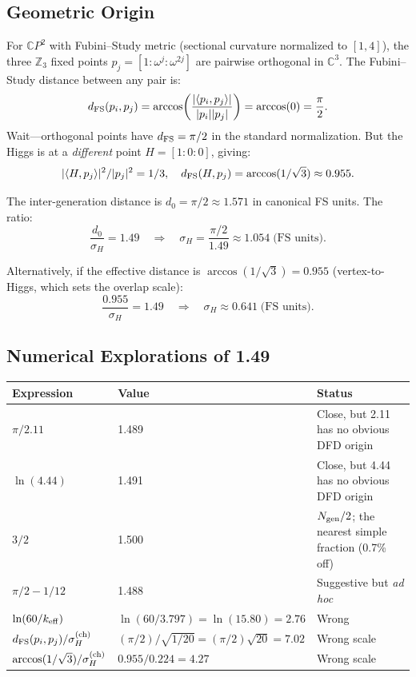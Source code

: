 \documentclass[11pt]{article}
\newcommand{\CP}{\mathbb{C}P}
\theoremstyle{remark}
\begin{document}
\subsection{Geometric Origin}

For $\CP^2$ with Fubini--Study metric (sectional curvature
normalized to $[1,4]$), the three $\mathbb{Z}_3$ fixed points
$p_j = [1:\omega^j:\omega^{2j}]$ are pairwise orthogonal in $\mathbb{C}^3$.
The Fubini--Study distance between any pair is:
\begin{equation}
d_{\rm FS}(p_i, p_j) = \arccos\!\left(\frac{|\langle p_i, p_j\rangle|}{|p_i||p_j|}\right)
= \arccos(0) = \frac{\pi}{2}.
\end{equation}
Wait---orthogonal points have $d_{\rm FS} = \pi/2$ in the standard
normalization. But the Higgs is at a \emph{different} point
$H = [1:0:0]$, giving:
\begin{equation}
|\langle H, p_j\rangle|^2 / |p_j|^2 = 1/3, \quad
d_{\rm FS}(H, p_j) = \arccos(1/\sqrt{3}) \approx 0.955.
\end{equation}

The inter-generation distance is $d_0 = \pi/2 \approx 1.571$ in
canonical FS units. The ratio:
\begin{equation}
\frac{d_0}{\sigma_H} = 1.49 \quad \Longrightarrow \quad
\sigma_H = \frac{\pi/2}{1.49} \approx 1.054 \;\text{(FS units)}.
\end{equation}

Alternatively, if the effective distance is $\arccos(1/\sqrt{3}) = 0.955$
(vertex-to-Higgs, which sets the overlap scale):
\begin{equation}
\frac{0.955}{\sigma_H} = 1.49 \quad \Longrightarrow \quad
\sigma_H \approx 0.641 \;\text{(FS units)}.
\end{equation}

\subsection{Numerical Explorations of 1.49}

\begin{center}
\begin{tabular}{lll}
\toprule
\textbf{Expression} & \textbf{Value} & \textbf{Status} \\
\midrule
$\pi/2.11$ & 1.489 & Close, but 2.11 has no obvious DFD origin \\
$\ln(4.44)$ & 1.491 & Close, but 4.44 has no obvious DFD origin \\
$3/2$ & 1.500 & $N_{\rm gen}/2$; the nearest simple fraction (0.7\% off) \\
$\pi/2 - 1/12$ & 1.488 & Suggestive but \textit{ad hoc} \\
$\ln(60/k_{\rm eff})$ & $\ln(60/3.797) = \ln(15.80) = 2.76$ & Wrong \\
$d_{\rm FS}(p_i,p_j)/\sigma_H^{\rm (ch)}$ & $(\pi/2)/\sqrt{1/20} = (\pi/2)\sqrt{20} = 7.02$ & Wrong scale \\
$\arccos(1/\sqrt{3})/\sigma_H^{\rm (ch)}$ & $0.955/0.224 = 4.27$ & Wrong scale \\
\bottomrule
\end{tabular}
\end{center}
\end{document}
